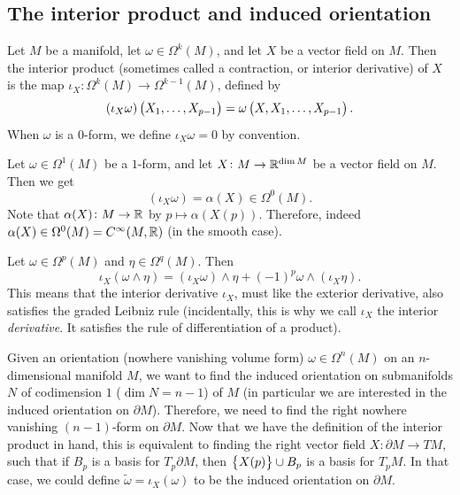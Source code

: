 \documentclass[11pt,a4paper]{article}
\begin{document}
\subsection{The interior product and induced orientation}
\label{subsec:induced-orientation}
\begin{definition}
  Let $M$ be a manifold,
  let $\omega \in \Omega^k(M)$,
  and let $X$ be a vector field on $M$.
  Then the interior product (sometimes called a contraction,
  or interior derivative) of $X$ is the map
  $\iota_X \colon \Omega^k(M) \to \Omega^{k-1}(M)$,
  defined by
  \[
    (\iota_X \omega)\del{X_1,\dots,X_{p-1}} =
    \omega \del{X,X_1,\dots,X_{p-1}}.
  \]
  When $\omega$ is a $0$-form,
  we define $\iota_X \omega = 0$ by convention.
\end{definition}
\begin{example}
  Let $\omega \in \Omega^1(M)$ be a $1$-form,
  and let $X \colon M \to \mathbb{R}^{\dim M}$ be a vector field on $M$.
  Then we get
  \[
    (\iota_X \omega) = \alpha(X) \in \Omega^0(M).
  \]
  Note that $\alpha(X) \colon M \to \mathbb{R}$ by $p \mapsto \alpha(X(p))$.
  Therefore, indeed $\alpha(X) \in \Omega^0(M) = C^{\infty}(M,\mathbb{R})$
  (in the smooth case).
\end{example}
\begin{remark}
  Let $\omega \in \Omega^p(M)$ and $\eta \in \Omega^q(M)$.
  Then
  \[
    \iota_X(\omega \wedge \eta) =
    (\iota_X \omega) \wedge \eta + (-1)^p \omega \wedge (\iota_X \eta).
  \]
  This means that the interior derivative $\iota_X$,
  must like the exterior derivative,
  also satisfies the graded Leibniz rule
  (incidentally, this is why we call $\iota_X$
  the interior \textit{derivative}.
  It satisfies the rule of differentiation of a product).
\end{remark}

Given an orientation (nowhere vanishing volume form) $\omega \in \Omega^n(M)$
on an $n$-dimensional manifold $M$,
we want to find the induced orientation on submanifolds $N$ of 
codimension $1$ ($\dim N = n - 1$) of $M$
(in particular we are interested in the induced orientation on $\partial M$).
Therefore, we need to find the right nowhere vanishing $(n-1)$-form
on $\partial M$.
Now that we have the definition of the interior product in hand,
this is equivalent to finding the right vector field
$X \colon \partial M \to TM$,
such that if $B_p$ is a basis for $T_p \partial M$,
then $\left\{X(p)\right\} \cup B_p$ is a basis for $T_p M$.
In that case, we could define $\tilde \omega = \iota_X(\omega)$
to be the induced orientation on $\partial M$.
\end{document}
